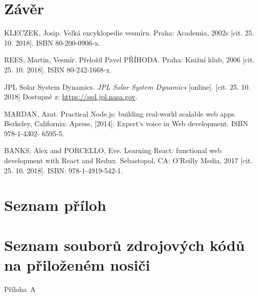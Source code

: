 \documentclass[a4paper,12pt]{article}
\begin{document}
\section*{Závěr}



\clearpage {} {}

\begin{thebibliography}{99}	%


KLECZEK, Josip. Velká encyklopedie vesmíru. Praha: Academia, 2002s [cit. 25. 10. 2018]. ISBN 80-200-0906-x.

REES, Martin, Vesmír. Přeložil Pavel PŘÍHODA. Praha: Knižní klub, 2006 [cit. 25. 10. 2018]. ISBN 80-242-1668-x.

JPL Solar System Dynamics. \textit{JPL Solar System Dynamics} [online]. [cit. 25. 10. 2018] Dostupné z: \url{https://ssd.jpl.nasa.gov}.

MARDAN, Azat. Practical Node.js: building real-world scalable web apps. Berkeley, California: Apress, [2014]. Expert‘s voice in Web development. ISBN 978-1-4302- 6595-5.

BANKS, Alex and PORCELLO, Eve. Learning React: functional web development with React and Redux. Sebastopol, CA: O'Reilly Media, 2017 [cit. 25. 10. 2018]. ISBN: 978-1-4919-542-1.


\end{thebibliography}



\clearpage {} {}
\section*{Seznam příloh}

\clearpage {} {}
\section*{Seznam souborů zdrojových kódů na přiloženém nosiči}

\noindent Příloha~A \dotfill \pageref{prilohaA}

\end{document}
